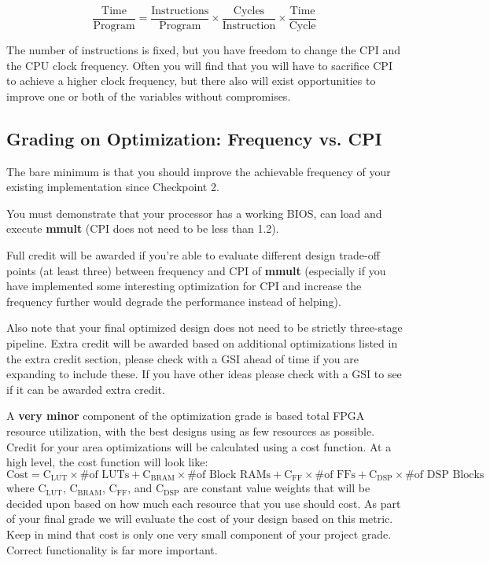 \documentclass[11pt]{article}
\begin{document}
\begin{equation*}
\frac{\text{Time}}{\text{Program}} = \frac{\text{Instructions}}{\text{Program}} \times \frac{\text{Cycles}}{\text{Instruction}} \times \frac{\text{Time}}{\text{Cycle}}
\end{equation*}

The number of instructions is fixed, but you have freedom to change the CPI and the CPU clock frequency.
Often you will find that you will have to sacrifice CPI to achieve a higher clock frequency, but there also will exist opportunities to improve one or both of the variables without compromises.

\subsection{Grading on Optimization: Frequency vs. CPI}
The bare minimum is that you should improve the achievable frequency of your existing implementation since Checkpoint 2.

You must demonstrate that your processor has a working BIOS, can load and execute \textbf{mmult} (CPI does not need to be less than 1.2).

Full credit will be awarded if you're able to evaluate different design trade-off points (at least three) between frequency and CPI of \textbf{mmult} (especially if you have implemented some interesting optimization for CPI and increase the frequency further would degrade the performance instead of helping).

Also note that your final optimized design does not need to be strictly three-stage pipeline. Extra credit will be awarded based on additional optimizations listed in the extra credit section, please check with a GSI ahead of time if you are expanding to include these. If you have other ideas please check with a GSI to see if it can be awarded extra credit.

A \textbf{very minor} component of the optimization grade is based total FPGA resource utilization, with the best designs using as few resources as possible.
Credit for your area optimizations will be calculated using a cost function.
At a high level, the cost function will look like:
\begin{equation*}
\mathrm{Cost}=\mathrm{C_{LUT}} \times \text{\# of LUTs} + \mathrm{C_{BRAM}} \times \text{\# of Block RAMs} + \mathrm{C_{FF}} \times \text{\# of FFs} + \mathrm{C_{DSP}} \times \text{\# of DSP Blocks}
\end{equation*}
where $\mathrm{C_{LUT}}$, $\mathrm{C_{BRAM}}$, $\mathrm{C_{FF}}$, and $\mathrm{C_{DSP}}$ are constant value weights that will be decided upon based on how much each resource that you use should cost. As part of your final grade we will evaluate the cost of your design based on this metric. Keep in mind that cost is only one very small component of your project grade. Correct functionality is far more important.
\end{document}
